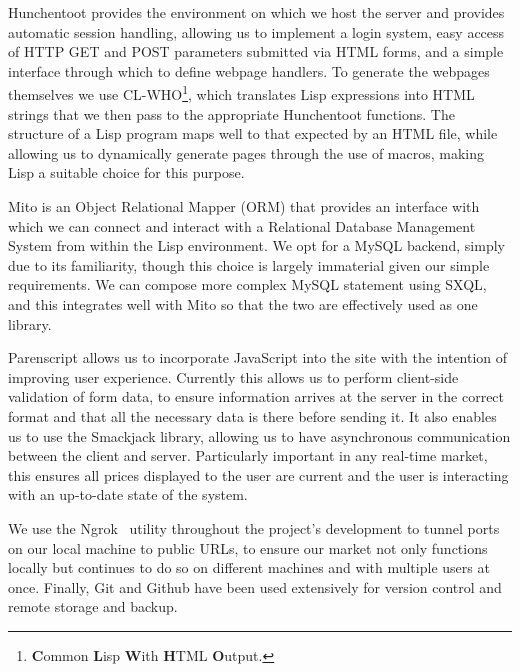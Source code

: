 Hunchentoot provides the environment on which we host the server and provides
automatic session handling, allowing us to implement a login system, easy
access of HTTP GET and POST parameters submitted via HTML forms, and a simple
interface through which to define webpage handlers. To generate the webpages
themselves we use CL-WHO\footnote{\textbf{C}ommon \textbf{L}isp \textbf{W}ith
\textbf{H}TML \textbf{O}utput.}, which translates Lisp expressions into HTML
strings that we then pass to the appropriate Hunchentoot functions. The
structure of a Lisp program maps well to that expected by an HTML file, while
allowing us to dynamically generate pages through the use of macros, making
Lisp a suitable choice for this purpose.

Mito is an Object Relational Mapper (ORM) that provides an interface with which
we can connect and interact with a Relational Database Management System from
within the Lisp environment. We opt for a MySQL backend, simply due to its
familiarity, though this choice is largely immaterial given our simple
requirements. We can compose more complex MySQL statement using SXQL, and this
integrates well with Mito so that the two are effectively used as one library.

Parenscript allows us to incorporate JavaScript into the site with the
intention of improving user experience. Currently this allows us to perform
client-side validation of form data, to ensure information arrives at the
server in the correct format and that all the necessary data is there before
sending it. It also enables us to use the Smackjack library, allowing us to
have asynchronous communication between the client and server. Particularly
important in any real-time market, this ensures all prices displayed to the
user are current and the user is interacting with an up-to-date state of the
system.

We use the Ngrok~\cite{ngrok} utility throughout the project's development to
tunnel ports on our local machine to public URLs, to ensure our market not only
functions locally but continues to do so on different machines and with
multiple users at once. Finally, Git and Github have been used extensively for
version control and remote storage and backup.
